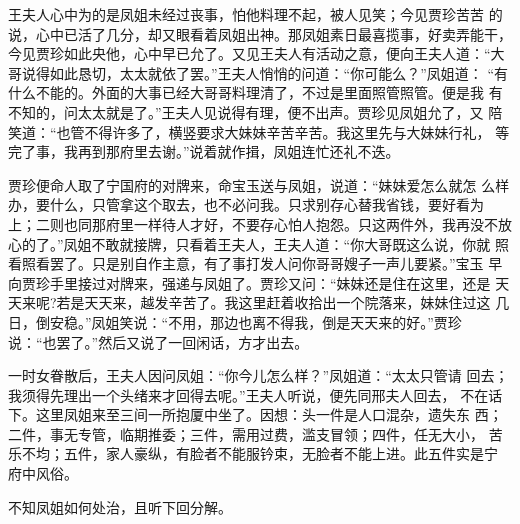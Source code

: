 王夫人心中为的是凤姐未经过丧事，怕他料理不起，被人见笑；今见贾珍苦苦
的说，心中已活了几分，却又眼看着凤姐出神。那凤姐素日最喜揽事，好卖弄能干，
今见贾珍如此央他，心中早已允了。又见王夫人有活动之意，便向王夫人道：“大
哥说得如此恳切，太太就依了罢。”王夫人悄悄的问道：“你可能么？”凤姐道：
“有什么不能的。外面的大事已经大哥哥料理清了，不过是里面照管照管。便是我
有不知的，问太太就是了。”王夫人见说得有理，便不出声。贾珍见凤姐允了，又
陪笑道：“也管不得许多了，横竖要求大妹妹辛苦辛苦。我这里先与大妹妹行礼，
等完了事，我再到那府里去谢。”说着就作揖，凤姐连忙还礼不迭。

贾珍便命人取了宁国府的对牌来，命宝玉送与凤姐，说道：“妹妹爱怎么就怎
么样办，要什么，只管拿这个取去，也不必问我。只求别存心替我省钱，要好看为
上；二则也同那府里一样待人才好，不要存心怕人抱怨。只这两件外，我再没不放
心的了。”凤姐不敢就接牌，只看着王夫人，王夫人道：“你大哥既这么说，你就
照看照看罢了。只是别自作主意，有了事打发人问你哥哥嫂子一声儿要紧。”宝玉
早向贾珍手里接过对牌来，强递与凤姐了。贾珍又问：“妹妹还是住在这里，还是
天天来呢?若是天天来，越发辛苦了。我这里赶着收拾出一个院落来，妹妹住过这
几日，倒安稳。”凤姐笑说：“不用，那边也离不得我，倒是天天来的好。”贾珍
说：“也罢了。”然后又说了一回闲话，方才出去。

一时女眷散后，王夫人因问凤姐：“你今儿怎么样？”凤姐道：“太太只管请
回去；我须得先理出一个头绪来才回得去呢。”王夫人听说，便先同邢夫人回去，
不在话下。这里凤姐来至三间一所抱厦中坐了。因想：头一件是人口混杂，遗失东
西；二件，事无专管，临期推委；三件，需用过费，滥支冒领；四件，任无大小，
苦乐不均；五件，家人豪纵，有脸者不能服钤束，无脸者不能上进。此五件实是宁
府中风俗。

不知凤姐如何处治，且听下回分解。